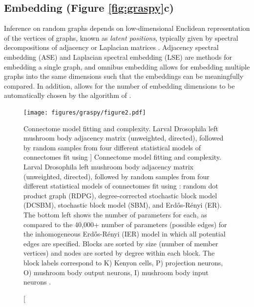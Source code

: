 \subsection{Embedding (Figure \ref{fig:graspy}c)}
Inference on random graphs depends on low-dimensional Euclidean representation of the vertices of graphs, known as \textit{latent positions}, typically given by spectral decompositions of adjacency or Laplacian matrices \cite{levin2017central}. Adjacency spectral embedding (ASE) and Laplacian spectral embedding (LSE) are methods for embedding a single graph, and omnibus embedding allows for embedding multiple graphs into the same dimensions such that the embeddings can be meaningfully compared. In addition, \graspy allows for the number of embedding dimensions to be automatically chosen by the algorithm of \cite{zhu2006automatic}. 

\begin{figure}[t!]
    \centering
    \texttt{[image: figures/graspy/figure2.pdf]}
    \caption
    [Connectome model fitting and complexity.  Larval Drosophila left mushroom body adjacency matrix (unweighted, directed), followed by random samples from four different statistical models of connectomes fit using \graspy]
    {Connectome model fitting and complexity.  Larval Drosophila left mushroom body adjacency matrix (unweighted, directed), followed by random samples from four different statistical models of connectomes fit using \graspy: random dot product graph (RDPG), degree-corrected stochastic block model (DCSBM), stochastic block model (SBM), and Erd\H os-R\'enyi (ER). The bottom left shows the number of parameters for each, as compared to the 40,000+ number of parameters (possible edges) for the inhomogeneous Erd\H os-R\'enyi (IER) model in which all potential edges are specified. Blocks are sorted by size (number of member vertices) and nodes are sorted by degree within each block. The block labels correspond to K) Kenyon cells, P) projection neurons, O) mushroom body output neurons, I) mushroom body input neurons \cite{eichler2017complete}.
    }
    \label{fig:my_label}
\end{figure}

